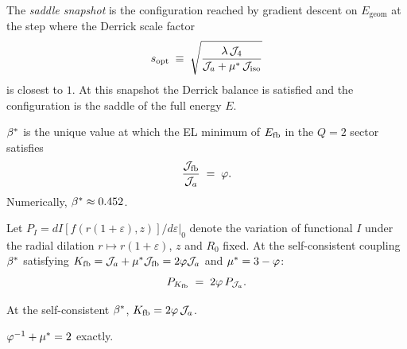 

\begin{definition}
\label{P1:def:snapshot}
The \emph{saddle snapshot} is the configuration reached by gradient
descent on $E_{\mathrm{geom}}$ at the step where the Derrick scale factor
\begin{equation}
  s_{\mathrm{opt}} \;\equiv\; \sqrt{\frac{\lambda\,\mathcal{J}_4}{\mathcal{J}_a+\mu^*\,\mathcal{J}_{\mathrm{iso}}}}
  \label{P1:eq:sopt_def}
\end{equation}
is closest to $1$.  At this snapshot the Derrick balance is satisfied
and the configuration is the saddle of the full energy $E$.
\end{definition}

\begin{definition}
\label{P1:def:bstar}
$\beta^{*}$ is the unique value at which the EL minimum of $E_{\mathrm{fb}}$ in the
$Q=2$ sector satisfies
\begin{equation}
  \frac{\mathcal{J}_{\mathrm{fb}}}{\mathcal{J}_a} \;=\; \varphi.
  \label{P1:eq:virial_def}
\end{equation}
Numerically, $\beta^{*} \approx 0.452$.
\end{definition}

\begin{proposition}[$P_{\Kfb} = 2\vp\,P_{\Ja}$ is an algebraic identity]
\label{P1:prop:PKfb}
Let $P_I = d I[f(r(1+\varepsilon),z)]/d\varepsilon|_0$ denote the
variation of functional $I$ under the radial dilation
$r\mapsto r(1+\varepsilon)$, $z$ and $R_0$ fixed.
At the self-consistent coupling $\beta^{*}$ satisfying
$K_{\mathrm{fb}} = \mathcal{J}_a + \mu^*\mathcal{J}_{\mathrm{fb}} = 2\varphi\mathcal{J}_a$ and $\mu^* = 3-\varphi$:
\begin{equation}
  P_{K_{\mathrm{fb}}} \;=\; 2\varphi\,P_{\mathcal{J}_a}.
  \label{P1:eq:PKfb_exact}
\end{equation}
\end{proposition}

\begin{proposition}
\label{P1:prop:Kfb}
At the self-consistent $\beta^{*}$,
$K_{\mathrm{fb}} = 2\varphi\,\mathcal{J}_a$.
\end{proposition}

\begin{lemma}
\label{P1:lem:virial}
$\varphi^{-1} + \mu^* = 2$ exactly.
\end{lemma}

